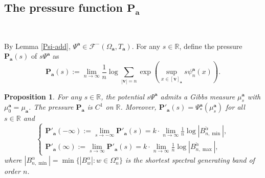 \documentclass[reqno,11pt,graphicx,]{amsart}
\numberwithin{equation}{section}
\theoremstyle{plain}
\newcommand{\N}{{\mathbb N}}
\newcommand{\R}{{\mathbb R}}
\newcommand{\p}{\mathbf P}
\newcommand{\3}{\mathbf{3}}
\newcommand{\ma}{\mathbf{a}}
\newcommand{\mv}{\mathbf{v}}
\newtheorem{proposition}[theorem]{Proposition}
\begin{document}
	\subsection{The pressure function $\p_{\ma}$}\
	
	By Lemma \ref{Psi-add}, $\Psi^{\ma}\in\mathcal{F}^{-}(\Omega_{\ma},T_{\ma})$. For any $s\in\R$, define the pressure $\p_{\ma}(s)$ of $s\Psi^{\mathbf{a}}$ as
	\begin{equation}\label{def-pressure}
		\p_{\ma}(s):=\lim\limits_{n\to\infty}\frac{1}{n}\log\sum_{|\mv|=n}\exp(\sup_{x\in[\mv]_{\ma}}s\psi^{\mathbf{a}}_n(x)).
	\end{equation}
	
	\begin{proposition}\label{trans-band} 
		For any $s\in\R$, the potential $s\Psi^{\ma}$ admits a Gibbs measure $\mu^{\ma}_{s}$ with $\mu^{\ma}_{0}=\mu_{\ma}$. The pressure $\p_{\ma}$ is $C^1$ on $\R$. Moreover, $\p'_{\ma}(s)=\Psi^{\ma}_*(\mu^{\ma}_{s})$ for all $s\in\R$ and 
		\begin{equation*}
			\begin{cases}
				\p'_{\ma}(-\infty):=\lim\limits_{s\to-\infty}\p'_{\ma}(s)=k\cdot\lim\limits_{n\to\infty}\frac{1}{n}\log|B^{\check{\alpha}}_{n,\min}|,\\ \p'_{\ma}(\infty):=\lim\limits_{s\to\infty}\p'_{\ma}(s)=k\cdot\lim\limits_{n\to\infty}\frac{1}{n}\log|B^{\check{\alpha}}_{n,\max}|,
			\end{cases}
		\end{equation*}
		where $|B^{\alpha}_{n,\min}|=\min\{|B^{\alpha}_w|:w\in\Omega^{\alpha}_n\}$ is the shortest spectral generating band of order $n$.
	\end{proposition}
\end{document}
